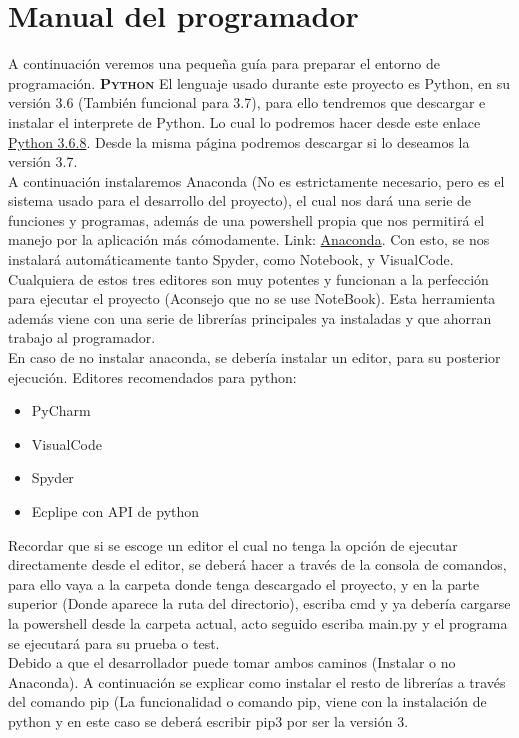 \section{Manual del programador}
A continuación veremos una pequeña guía para preparar el entorno de programación.
\textbf{\textsc{Python}}
El lenguaje usado durante este proyecto es Python, en su versión 3.6 (También funcional para 3.7), para ello tendremos que descargar e instalar el interprete de Python. Lo cual lo podremos hacer desde este enlace \href{https://www.python.org/downloads/release/python-368/}{Python 3.6.8}. Desde la misma página podremos descargar si lo deseamos la versión 3.7.\\
A continuación instalaremos Anaconda (No es estrictamente necesario, pero es el sistema usado para el desarrollo del proyecto), el cual nos dará una serie de funciones y programas, además de una powershell propia que nos permitirá el manejo por la aplicación más cómodamente. Link: \href{https://www.anaconda.com/distribution/}{Anaconda}. Con esto, se nos instalará automáticamente tanto Spyder, como Notebook, y VisualCode. Cualquiera de estos tres editores son muy potentes y funcionan a la perfección para ejecutar el proyecto (Aconsejo que no se use NoteBook). Esta herramienta además viene con una serie de librerías principales ya instaladas y que ahorran trabajo al programador.\\
En caso de no instalar anaconda, se debería instalar un editor, para su posterior ejecución. Editores recomendados para python:
\begin{itemize}
\item PyCharm
\item VisualCode
\item Spyder
\item Ecplipe con API de python
\end{itemize}
Recordar que si se escoge un editor el cual no tenga la opción de ejecutar directamente desde el editor, se deberá hacer a través de la consola de comandos, para ello vaya a la carpeta donde tenga descargado el proyecto, y en la parte superior (Donde aparece la ruta del directorio), escriba cmd y ya debería cargarse la powershell desde la carpeta actual, acto seguido escriba main.py y el programa se ejecutará para su prueba o test.\\
Debido a que el desarrollador puede tomar ambos caminos (Instalar o no Anaconda). A continuación se explicar como instalar el resto de librerías a través del comando pip (La funcionalidad o comando pip, viene con la instalación de python y en este caso se deberá escribir pip3 por ser la versión 3.
